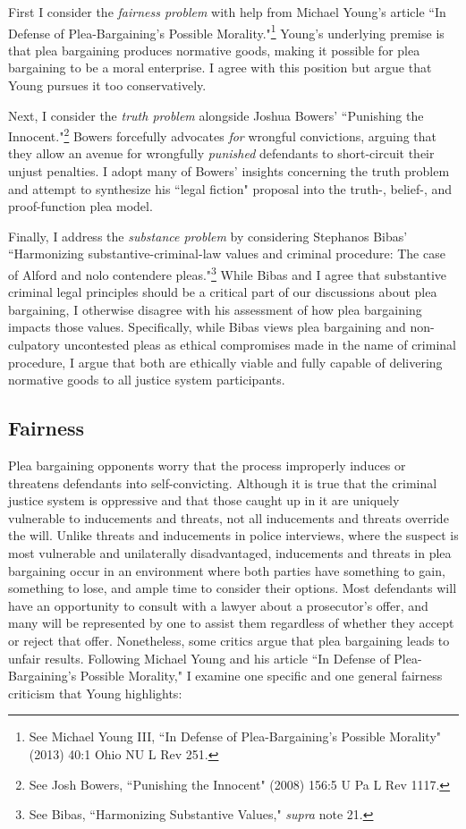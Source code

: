 First I consider the \textit{fairness problem} with help from Michael Young's article ``In Defense of Plea-Bargaining's Possible Morality."\footnote{See Michael Young III, ``In Defense of Plea-Bargaining's Possible Morality" (2013) 40:1 Ohio NU L Rev 251.} Young's underlying premise is that plea bargaining produces normative goods, making it possible for plea bargaining to be a moral enterprise. I agree with this position but argue that Young pursues it too conservatively. 

Next, I consider the \textit{truth problem} alongside Joshua Bowers' ``Punishing the Innocent."\footnote{See Josh Bowers, ``Punishing the Innocent" (2008) 156:5 U Pa L Rev 1117.} Bowers forcefully advocates \textit{for} wrongful convictions, arguing that they allow an avenue for wrongfully \textit{punished} defendants to short-circuit their unjust penalties. I adopt many of Bowers' insights concerning the truth problem and attempt to synthesize his ``legal fiction" proposal into the truth-, belief-, and proof-function plea model. 

Finally, I address the \textit{substance problem} by considering Stephanos Bibas' ``Harmonizing substantive-criminal-law values and criminal procedure: The case of Alford and nolo contendere pleas."\footnote{See Bibas, ``Harmonizing Substantive Values," \textit{supra} note 21.} While Bibas and I agree that substantive criminal legal principles should be a critical part of our discussions about plea bargaining, I otherwise disagree with his assessment of how plea bargaining impacts those values. Specifically, while Bibas views plea bargaining and non-culpatory uncontested pleas as ethical compromises made in the name of criminal procedure, I argue that both are ethically viable and fully capable of delivering normative goods to all justice system participants.

\subsection{Fairness}

Plea bargaining opponents worry that the process improperly induces or threatens defendants into self-convicting. Although it is true that the criminal justice system is oppressive and that those caught up in it are uniquely vulnerable to inducements and threats, not all inducements and threats override the will. Unlike threats and inducements in police interviews, where the suspect is most vulnerable and unilaterally disadvantaged, inducements and threats in plea bargaining occur in an environment where both parties have something to gain, something to lose, and ample time to consider their options. Most defendants will have an opportunity to consult with a lawyer about a prosecutor's offer, and many will be represented by one to assist them regardless of whether they accept or reject that offer. Nonetheless, some critics argue that plea bargaining leads to unfair results. Following Michael Young and his article ``In Defense of Plea-Bargaining's Possible Morality," I examine one specific and one general fairness criticism that Young highlights:

